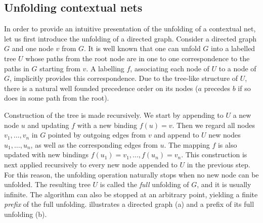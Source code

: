 \documentclass[11pt,a4paper]{article}
\begin{document}
\subsection{Unfolding contextual nets}
\label{sec:unfolding.contextual}

In order to provide an intuitive presentation of the unfolding of a contextual
net, let us first introduce the unfolding of a directed graph.  Consider a
directed graph $G$ and one node $v$ from $G$.  It is well known that one can
unfold $G$ into a labelled tree $U$ whose paths from the root node are in one
to one correspondence to the paths in $G$ starting from $v$.  A labelling $f$,
associating each node of $U$ to a node of $G$, implicitly provides this
correspondence.  Due to the tree-like structure of $U$, there is a natural well
founded precedence order on its nodes ($a$ precedes $b$ if so does in some path
from the root).

Construction of the tree is made recursively.  We start by appending to $U$ a
new node $u$ and updating $f$ with a new binding $f(u) = v$.  Then we regard
all nodes $v_1, \ldots, v_n$ in $G$ pointed by outgoing edges from $v$ and
append to $U$ new nodes $u_1, \ldots, u_n$, as well as the corresponding edges
from $u$.  The mapping $f$ is also updated with new bindings $f(u_1) = v_1,
\ldots, f(u_n) = v_n$.  This construction is next applied recursively to every
new node appended to $U$ in the previous step.  For this reason, the unfolding
operation naturally stops when no new node can be unfolded.  The resulting tree
$U$ is called the \emph{full} unfolding of $G$, and it is usually infinite.
The algorithm can also be stopped at an arbitrary point, yielding a finite
\emph{prefix} of the full unfolding.   illustrates a directed
graph (a) and a prefix of its full unfolding (b).

%
%
%
\end{document}
